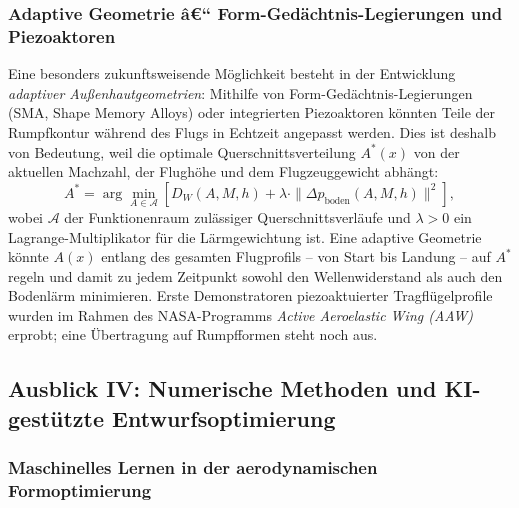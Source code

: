 ﻿\documentclass[12pt,a4paper]{article}
\theoremstyle{definition}
\theoremstyle{remark}
\begin{document}
\subsubsection{Adaptive Geometrie â€“ Form-Gedächtnis-Legierungen und Piezoaktoren}

Eine besonders zukunftsweisende Möglichkeit besteht in der Entwicklung \emph{adaptiver
Außenhautgeometrien}: Mithilfe von Form-Gedächtnis-Legierungen (SMA, Shape Memory Alloys)
oder integrierten Piezoaktoren könnten Teile der Rumpfkontur während des Flugs in Echtzeit
angepasst werden. Dies ist deshalb von Bedeutung, weil die optimale Querschnittsverteilung
$A^\ast(x)$ von der aktuellen Machzahl, der Flughöhe und dem Flugzeuggewicht abhängt:
\begin{equation}
  A^\ast = \arg\min_{A \in \mathcal{A}} \left[ D_W(A, M, h) + \lambda \cdot \|\Delta p_\text{boden}(A, M, h)\|^2 \right],
  \label{eq:adaptiv_opt}
\end{equation}
wobei $\mathcal{A}$ der Funktionenraum zulässiger Querschnittsverläufe und $\lambda > 0$
ein Lagrange-Multiplikator für die Lärmgewichtung ist. Eine adaptive Geometrie könnte
$A(x)$ entlang des gesamten Flugprofils -- von Start bis Landung -- auf $A^\ast$ regeln
und damit zu jedem Zeitpunkt sowohl den Wellenwiderstand als auch den Bodenlärm minimieren.
Erste Demonstratoren piezoaktuierter Tragflügelprofile wurden im Rahmen des NASA-Programms
\emph{Active Aeroelastic Wing (AAW)} erprobt; eine Übertragung auf Rumpfformen steht noch aus.

\subsection{Ausblick IV: Numerische Methoden und KI-gestützte Entwurfsoptimierung}
\label{sec:ausblick_ki}

\subsubsection{Maschinelles Lernen in der aerodynamischen Formoptimierung}
\end{document}
